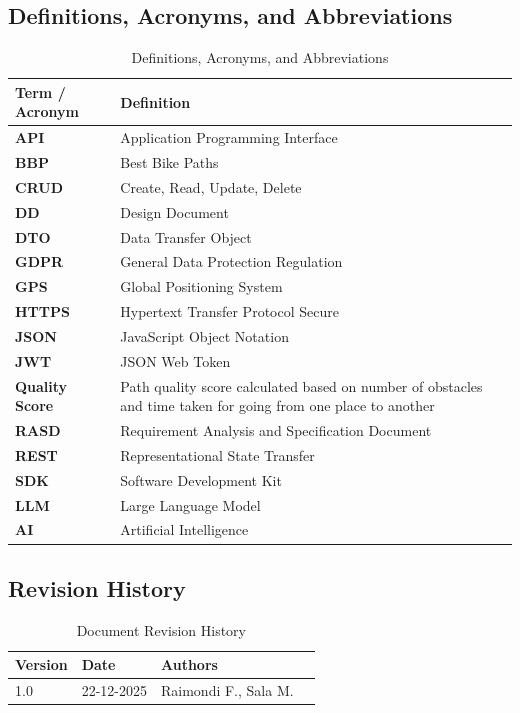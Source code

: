 \subsection{Definitions, Acronyms, and Abbreviations}
\begin{table}[H]
\centering
\renewcommand{\arraystretch}{1.5}
\begin{tabular}{|p{3.5cm}|p{10cm}|}
\hline
\textbf{Term / Acronym} & \textbf{Definition} \\
\hline
\textbf{API} & Application Programming Interface \\
\hline
\textbf{BBP} & Best Bike Paths \\
\hline
\textbf{CRUD} & Create, Read, Update, Delete \\
\hline
\textbf{DD} & Design Document \\
\hline
\textbf{DTO} & Data Transfer Object \\
\hline
\textbf{GDPR} & General Data Protection Regulation \\
\hline
\textbf{GPS} & Global Positioning System \\
\hline
\textbf{HTTPS} & Hypertext Transfer Protocol Secure \\
\hline
\textbf{JSON} & JavaScript Object Notation \\
\hline
\textbf{JWT} & JSON Web Token \\
\hline
\textbf{Quality Score} & Path quality score calculated based on number of obstacles and time taken for going from one place to another \\
\hline
\textbf{RASD} & Requirement Analysis and Specification Document \\
\hline
\textbf{REST} & Representational State Transfer \\
\hline
\textbf{SDK} & Software Development Kit \\
\hline
\textbf{LLM} & Large Language Model \\
\hline
\textbf{AI} & Artificial Intelligence \\
\hline
\end{tabular}
\caption{Definitions, Acronyms, and Abbreviations}
\label{tab:definitions}
\end{table}

\subsection{Revision History}
\begin{table}[h!]
\centering
\begin{tabular}{|l|l|l|l|}
\hline
\textbf{Version} & \textbf{Date} & \textbf{Authors} \\
\hline
1.0 & 22-12-2025 & Raimondi F., Sala M. \\
\hline
\end{tabular}
\caption{Document Revision History}
\end{table}

